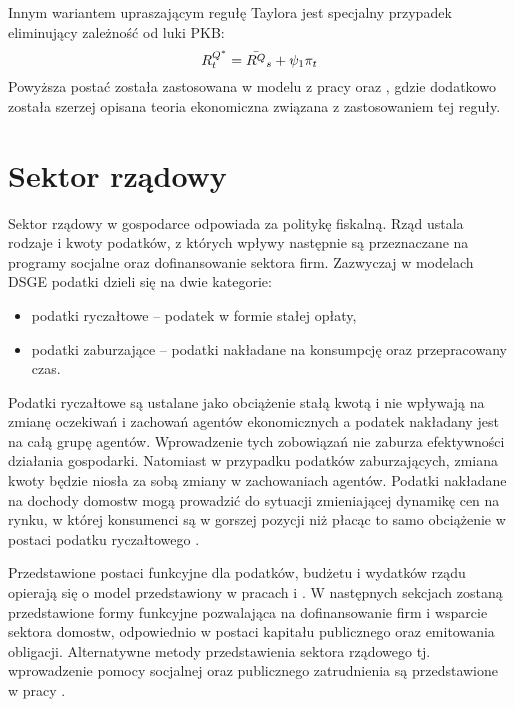 Innym wariantem upraszającym regułę Taylora jest specjalny przypadek eliminujący zależność od luki PKB:
\begin{equation}
    R^{Q^*}_t = \bar{R^{Q}}_s + \psi_1 \pi_t
\end{equation}
Powyższa postać została zastosowana w modelu z pracy \cite{gali_gov_spending} oraz \cite{gali}, gdzie dodatkowo została szerzej opisana teoria ekonomiczna związana z zastosowaniem tej reguły.

\section{Sektor rządowy}
\label{gov_sector}

Sektor rządowy w gospodarce odpowiada za politykę fiskalną. Rząd ustala rodzaje i kwoty podatków, z których wpływy  następnie są przeznaczane na programy socjalne oraz dofinansowanie sektora firm. Zazwyczaj w modelach DSGE podatki dzieli się na dwie kategorie:
\begin{itemize}
    \item podatki ryczałtowe -- podatek w formie stałej opłaty,
    \item podatki zaburzające -- podatki nakładane na konsumpcję oraz przepracowany czas.
\end{itemize}

Podatki ryczałtowe są ustalane jako obciążenie stałą kwotą i nie wpływają na zmianę oczekiwań i zachowań agentów ekonomicznych a podatek nakładany jest na całą grupę agentów\cite{costaBook}. Wprowadzenie tych zobowiązań nie zaburza efektywności działania gospodarki. Natomiast w przypadku podatków zaburzających, zmiana kwoty będzie niosła za sobą zmiany w zachowaniach agentów. Podatki nakładane na dochody domostw mogą prowadzić do sytuacji zmieniającej dynamikę cen na rynku, w której konsumenci są w gorszej pozycji niż płacąc to samo obciążenie w postaci podatku ryczałtowego \cite{distortionary_taxes}. 

Przedstawione postaci funkcyjne dla podatków, budżetu i wydatków rządu opierają się o model przedstawiony w pracach \cite{costaBook} i \cite{gali_gov_spending}. W następnych sekcjach zostaną przedstawione formy funkcyjne pozwalająca na dofinansowanie firm i wsparcie sektora domostw, odpowiednio w postaci kapitału publicznego oraz emitowania obligacji. Alternatywne metody przedstawienia sektora rządowego tj. wprowadzenie pomocy socjalnej oraz publicznego zatrudnienia są przedstawione w pracy \cite{costaBook}.

